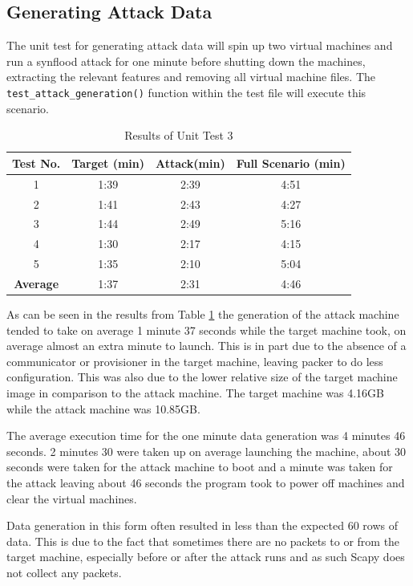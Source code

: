 \subsection{Generating Attack Data}
The unit test for generating attack data will spin up two virtual machines and run a synflood attack for one minute before shutting down the machines, extracting the relevant features and removing all virtual machine files. The  \texttt{test\_attack\_generation()} function within the test file will execute this scenario.
\begin{table}[H]
\centering
\caption{Results of Unit Test 3}
\label{table:unittest3}
\begin{tabular}{cccc}
    \textbf{Test No.}& \textbf{Target (min)}&\textbf{Attack(min)}& \textbf{Full Scenario (min)}\\
    \hline
    1& 1:39	&2:39& 4:51\\
    2& 1:41	&2:43& 4:27\\
    3& 1:44	&2:49& 5:16\\
    4& 1:30	&2:17& 4:15\\
    5& 1:35	&2:10& 5:04\\
    \hline
    \textbf{Average} & 1:37 & 2:31& 4:46
\end{tabular}
\end{table}
As can be seen in the results from Table \ref{table:unittest3} the generation of the attack machine tended to take on average 1 minute 37 seconds while the target machine took, on average almost an extra minute to launch. This is in part due to the absence of a communicator or provisioner in the target machine, leaving packer to do less configuration. This was also due to the lower relative size of the target machine image in comparison to the attack machine. The target machine was 4.16GB while the attack machine was 10.85GB. 

The average execution time for the one minute data generation was 4 minutes 46 seconds. 2 minutes 30 were taken up on average launching the machine, about 30 seconds were taken for the attack machine to boot and a minute was taken for the attack leaving about 46 seconds the program took to power off machines and clear the virtual machines. 

Data generation in this form often resulted in less than the expected 60 rows of data. This is due to the fact that sometimes there are no packets to or from the target machine, especially before or after the attack runs and as such Scapy does not collect any packets. 

